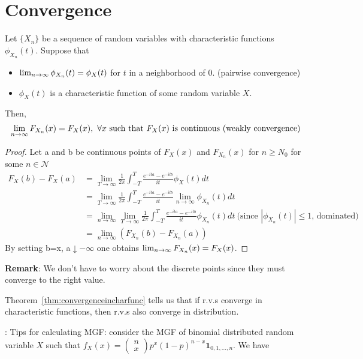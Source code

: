 \documentclass[../Transformation.tex]{subfiles}
\begin{document}
\section{Convergence}
\begin{theorem}\label{thm:convergenceincharfunc}
	Let $\{X_n \}$ be a sequence of random  variables with characteristic functions $\phi_{X_n}(t)$. Suppose that
	\begin{itemize}
		\item $\lim_{n\rightarrow\infty}\phi_{X_n}(t) = \phi_X(t)$ for $t$ in a neighborhood of 0. (pairwise convergence)
		\item $\phi_X(t)$ is a characteristic function of some random variable $X$.
	\end{itemize}
	Then,
	$$\limn F_{X_n}(x) = F_X(x),\ \forall x\mbox{ such that $F_X(x)\mbox{ is continuous (weakly convergence)}$}$$
\end{theorem}
	\begin{proof}
	Let a and b be continuous points of $F_X(x)$ and $F_{X_n}(x)$ for $n\geq N_0$ for some $n\in\mathcal{N}$
	\begin{align*}
	F_X(b)-F_X(a)&=\lim_{T\rightarrow\infty}\frac{1}{2\pi}\int_{-T}^T\frac{e^{-ita}-e^{-itb}}{it}\phi_X(t)dt\\
	&=\lim_{T\rightarrow\infty}\frac{1}{2\pi}\int_{-T}^T\frac{e^{-ita}-e^{-itb}}{it}\lim_{n\rightarrow\infty}\phi_{X_n}(t)dt\\
	&=\lim_{n\rightarrow\infty}\lim_{T\rightarrow\infty}\frac{1}{2\pi}\int_{-T}^T\frac{e^{-ita}-e^{-itb}}{it}\phi_{X_n}(t)dt\ \mbox{(since $|\phi_{X_n}(t)|\leq1$, dominated)}\\
	&=\lim_{n\rightarrow\infty}(F_{X_n}(b)-F_{X_n}(a))
	\end{align*}
	By setting b=x, a$\downarrow-\infty$ one obtains $\lim_{n\rightarrow\infty} F_{X_n}(x) = F_X(x)$.
	\end{proof}
{\bf Remark}: We don't have to worry about the discrete points since they must converge to the right value.\\
\begin{intuition}
	Theorem~\ref{thm:convergenceincharfunc} tells us that if r.v.s converge in characteristic functions, then r.v.s also converge in distribution.
\end{intuition}
: Tips for calculating MGF: consider the MGF of binomial distributed random variable $X$ such that $f_X(x)=\left(\begin{array}{c}
n\\
x
\end{array}\right)p^{x}(1-p)^{n-x}\mathbf{1}_{0,1,...,n}$. We have
\end{document}
